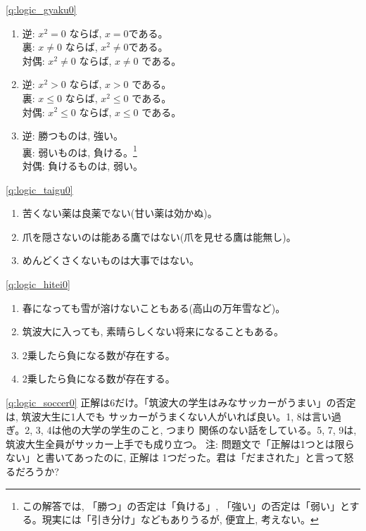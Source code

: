 \ref{q:logic_gyaku0}
\begin{enumerate}
\item  逆: $x^2 = 0$ ならば, $ x = 0$である。\\
        裏: $x \neq 0$ ならば, $x^2 \neq 0$である。\\
        対偶: $x^2 \neq 0$ ならば, $x \neq 0$ である。
\mv
\item  逆: $x^2 >0$ ならば, $x>0$ である。\\
        裏: $x \leq 0$ ならば, $x^2 \leq 0$ である。\\
        対偶: $x^2 \leq 0$ ならば, $x \leq 0$ である。
\mv
\item  逆: 勝つものは, 強い。\\
        裏: 弱いものは, 負ける。\footnote{この解答では, 「勝つ」の否定は「負ける」, 「強い」の否定は「弱い」とする。現実には「引き分け」などもありうるが, 便宜上, 考えない。}\\
        対偶: 負けるものは, 弱い。
\end{enumerate}
\hv

\ref{q:logic_taigu0} 
\begin{enumerate}
\item 苦くない薬は良薬でない(甘い薬は効かぬ)。
\item 爪を隠さないのは能ある鷹ではない(爪を見せる鷹は能無し)。
\item めんどくさくないものは大事ではない。
\end{enumerate}
\hv

\ref{q:logic_hitei0} 
\begin{enumerate}
\item 春になっても雪が溶けないこともある(高山の万年雪など)。
\item 筑波大に入っても, 素晴らしくない将来になることもある。
\item 2乗したら負になる数が存在する。
\item 2乗したら負になる数が存在する。
\end{enumerate}
\hv

\ref{q:logic_soccer0} 
正解は6だけ。「筑波大の学生はみなサッカーがうまい」の否定は, 筑波大生に1人でも
サッカーがうまくない人がいれば良い。1, 8は言い過ぎ。2, 3, 4は他の大学の学生のこと, つまり
関係のない話をしている。5, 7, 9は, 筑波大生全員がサッカー上手でも成り立つ。
{\small 注: 問題文で「正解は1つとは限らない」と書いてあったのに, 正解は
1つだった。君は「だまされた」と言って怒るだろうか?}
\hv

